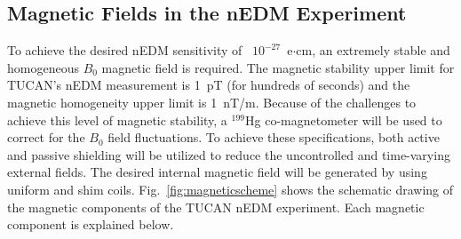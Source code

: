 




\subsection{Magnetic Fields in the nEDM Experiment}
To achieve the desired nEDM sensitivity of ~$10^{-27}$~e$\cdot$cm, an
extremely stable and homogeneous $B_0$ magnetic field is required.
The magnetic stability upper limit for TUCAN's nEDM measurement is
1~pT (for hundreds of seconds) and the magnetic homogeneity upper
limit is 1~nT/m.
Because of the challenges to achieve this level of magnetic stability,
a $^{199}$Hg co-magnetometer will be used to correct for the $B_0$
field fluctuations. To achieve these specifications, both active and
passive shielding will be utilized to reduce the uncontrolled and
time-varying external fields. The desired internal magnetic field will
be generated by using uniform and shim
coils. Fig.~\ref{fig:magneticscheme} shows the schematic drawing of
the magnetic components of the TUCAN nEDM experiment. Each magnetic
component is explained below.

